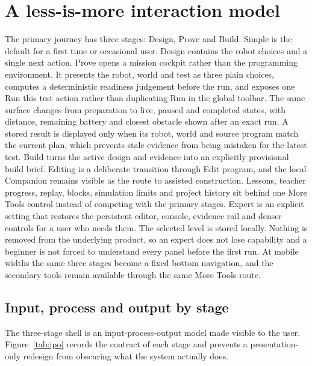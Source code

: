 \documentclass[11pt,a4paper]{report}
\begin{document}
\section{A less-is-more interaction model}
The primary journey has three stages: Design, Prove and Build. Simple is the default for a first time or occasional user. Design contains the robot choices and a single next action. Prove opens a mission cockpit rather than the programming environment. It presents the robot, world and test as three plain choices, computes a deterministic readiness judgement before the run, and exposes one Run this test action rather than duplicating Run in the global toolbar. The same surface changes from preparation to live, paused and completed states, with distance, remaining battery and closest obstacle shown after an exact run. A stored result is displayed only when its robot, world and source program match the current plan, which prevents stale evidence from being mistaken for the latest test. Build turns the active design and evidence into an explicitly provisional build brief. Editing is a deliberate transition through Edit program, and the local Companion remains visible as the route to assisted construction. Lessons, teacher progress, replay, blocks, simulation limits and project history sit behind one More Tools control instead of competing with the primary stages. Expert is an explicit setting that restores the persistent editor, console, evidence rail and denser controls for a user who needs them. The selected level is stored locally. Nothing is removed from the underlying product, so an expert does not lose capability and a beginner is not forced to understand every panel before the first run. At mobile widths the same three stages become a fixed bottom navigation, and the secondary tools remain available through the same More Tools route.

\subsection{Input, process and output by stage}
The three-stage shell is an input-process-output model made visible to the user. Figure~\ref{tab:ipo} records the contract of each stage and prevents a presentation-only redesign from obscuring what the system actually does.
\end{document}
